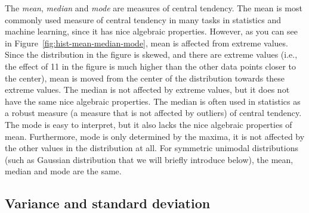 The \emph{mean}, \emph{median} and \emph{mode} are
measures of central tendency.
The mean is most commonly used measure of central tendency in many tasks in statistics and machine learning,
since it has nice algebraic properties.
However, as you can see in Figure~\ref{fig:hist-mean-median-mode},
mean is affected from extreme values.
Since the distribution in the figure is skewed,
and there are extreme values
(i.e., the effect of \num{11} in the figure is much higher than
the other data points closer to the center),
mean is moved from the center of the distribution
towards these extreme values.
The median is not affected by extreme values,
but it does not have the same nice algebraic properties.
The median is often used in statistics as a robust measure 
(a measure that is not affected by outliers) of central tendency.
The mode is easy to interpret,
but it also lacks the nice algebraic properties of mean.
Furthermore, mode is only determined by the maxima,
it is not affected by the other values in the distribution at all.
For symmetric unimodal distributions
(such as Gaussian distribution that we will briefly introduce below),
the mean, median and mode are the same.

\subsection{\label{ssec:variance-sd}Variance and standard deviation}

